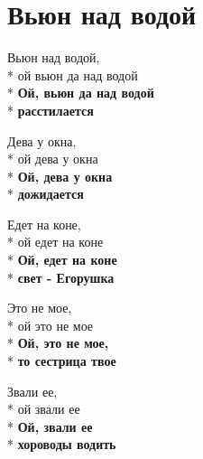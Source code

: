 \vspace{\fill}\newpage

\section{Вьюн над водой}
\label{song:Вьюн_над_водой}

\medskip

\begin{minipage}{\linewidth}
Вьюн над водой,\\*
ой вьюн да над водой\\*
\textbf{Ой, вьюн да над водой}\\*
\textbf{расстилается}\\
\end{minipage}\par\medskip\nobreak

\medskip

\begin{minipage}{\linewidth}
Дева у окна,\\*
ой дева у окна\\*
\textbf{Ой, дева у окна}\\*
\textbf{дожидается}\\
\end{minipage}\par\medskip\nobreak

\medskip

\begin{minipage}{\linewidth}
Едет на коне,\\*
ой едет на коне\\*
\textbf{Ой, едет на коне}\\*
\textbf{свет - Егорушка}\\
\end{minipage}\par\medskip\nobreak

\medskip

\begin{minipage}{\linewidth}
Это не мое,\\*
ой это не мое\\*
\textbf{Ой, это не мое,}\\*
\textbf{то сестрица твое}\\
\end{minipage}\par\medskip\nobreak

\medskip

\begin{minipage}{\linewidth}
Звали ее,\\*
ой звали ее\\*
\textbf{Ой, звали ее}\\*
\textbf{хороводы водить}\\
\end{minipage}\par\medskip\nobreak

